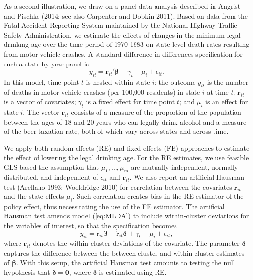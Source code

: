 \documentclass[12pt]{article}
\begin{document}
As a second illustration, we draw on a panel data analysis described in
Angrist and Pischke (2014; see also Carpenter and Dobkin 2011). Based on
data from the Fatal Accident Reporting System maintained by the National
Highway Traffic Safety Administration, we estimate the effects of
changes in the minimum legal drinking age over the time period of
1970-1983 on state-level death rates resulting from motor vehicle
crashes. A standard difference-in-differences specification for such a
state-by-year panel is \begin{equation}
\label{eq:MLDA}
y_{it} = \mathbf{r}_{it}'\boldsymbol\beta + \gamma_t + \mu_i + \epsilon_{it}.
\end{equation} In this model, time-point \(t\) is nested within state
\(i\); the outcome \(y_{it}\) is the number of deaths in motor vehicle
crashes (per 100,000 residents) in state \(i\) at time \(t\);
\(\mathbf{r}_{it}\) is a vector of covariates; \(\gamma_t\) is a fixed
effect for time point \(t\); and \(\mu_i\) is an effect for state \(i\).
The vector \(\mathbf{r}_{it}\) consists of a measure of the proportion
of the population between the ages of 18 and 20 years who can legally
drink alcohol and a measure of the beer taxation rate, both of which
vary across states and across time.

We apply both random effects (RE) and fixed effects (FE) approaches to
estimate the effect of lowering the legal drinking age. For the RE
estimates, we use feasible GLS based the assumption that
\(\mu_1,...,\mu_m\) are mutually independent, normally distributed, and
independent of \(\epsilon_{it}\) and \(\mathbf{r}_{it}\). We also report
an artificial Hausman test (Arellano 1993; Wooldridge 2010) for
correlation between the covariates \(\mathbf{r}_{it}\) and the state
effects \(\mu_i\). Such correlation creates bias in the RE estimator of
the policy effect, thus necessitating the use of the FE estimator. The
artificial Hausman test amends model (\ref{eq:MLDA}) to include
within-cluster deviations for the variables of interest, so that the
specification becomes \begin{equation}
y_{it} = \mathbf{r}_{it}\boldsymbol\beta + \mathbf{\ddot{r}}_{it}\boldsymbol\delta + \gamma_t + \mu_i + \epsilon_{it},
\end{equation} where \(\mathbf{\ddot{r}}_{it}\) denotes the
within-cluster deviations of the covariate. The parameter
\(\boldsymbol\delta\) captures the difference between the
between-cluster and within-cluster estimates of \(\boldsymbol\beta\).
With this setup, the artificial Hausman test amounts to testing the null
hypothesis that \(\boldsymbol\delta = \mathbf{0}\), where
\(\boldsymbol\delta\) is estimated using RE.
\end{document}

